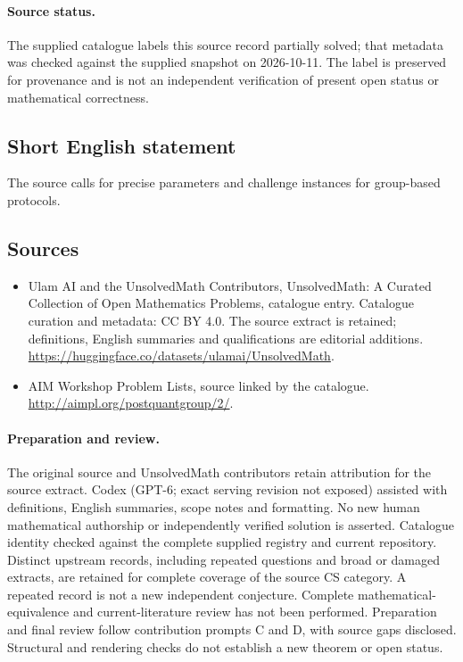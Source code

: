 \documentclass[11pt]{article}
\begin{document}
\paragraph{Source status.}
The supplied catalogue labels this source record partially solved; that metadata was checked against the supplied snapshot on 2026-10-11. The label is preserved for provenance and is not an independent verification of present open status or mathematical correctness.
\subsection{Short English statement}
The source calls for precise parameters and challenge instances for group-based protocols.
\subsection{Sources}
\begin{itemize}
\item[\hypertarget{source:statement:1}{S1}] Ulam AI and the UnsolvedMath Contributors, UnsolvedMath: A Curated Collection of Open Mathematics Problems, catalogue entry. Catalogue curation and metadata: CC BY 4.0. The source extract is retained; definitions, English summaries and qualifications are editorial additions.
\url{https://huggingface.co/datasets/ulamai/UnsolvedMath}.
\item[\hypertarget{source:statement:2}{S2}] AIM Workshop Problem Lists, source linked by the catalogue.
\url{http://aimpl.org/postquantgroup/2/}.
\end{itemize}
\paragraph{Preparation and review.}
The original source and UnsolvedMath contributors retain attribution for the source extract. Codex (GPT-6; exact serving revision not exposed) assisted with definitions, English summaries, scope notes and formatting. No new human mathematical authorship or independently verified solution is asserted. Catalogue identity checked against the complete supplied registry and current repository. Distinct upstream records, including repeated questions and broad or damaged extracts, are retained for complete coverage of the source CS category. A repeated record is not a new independent conjecture. Complete mathematical-equivalence and current-literature review has not been performed. Preparation and final review follow contribution prompts C and D, with source gaps disclosed. Structural and rendering checks do not establish a new theorem or open status.
\label{end:statement}
\end{document}

